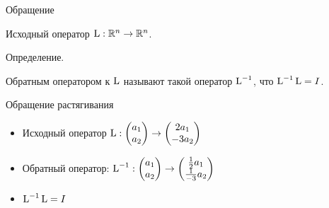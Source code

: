 

\begin{frame} %


\end{frame}
  

\begin{frame}{Обращение}


Исходный оператор $\operatorname{L} : \mathbb{R}^n \to \mathbb{R}^n$.


Определение. 

\alert{Обратным оператором} к $\operatorname{L}$ называют такой оператор $\operatorname{L}^{-1}$, 
что $\operatorname{L}^{-1} \operatorname{L} = I$. 


\end{frame}


\begin{frame}{Обращение растягивания}

\begin{itemize}[<+->]
    \item 
Исходный оператор $\operatorname{L} : \begin{pmatrix}
  a_1 \\
  a_2 \\
\end{pmatrix} \to
\begin{pmatrix}
  2a_1 \\
  -3a_2 \\
\end{pmatrix}
$

\item \alert{Обратный оператор}:  
$\operatorname{L}^{-1} : \begin{pmatrix}
    a_1 \\
    a_2 \\
  \end{pmatrix} \to
  \begin{pmatrix}
    \frac{1}{2}a_1 \\
    \frac{1}{-3}a_2 \\
  \end{pmatrix}
  $

\item $\operatorname{L}^{-1} \operatorname{L} = I$
\end{itemize}


\end{frame}
    


